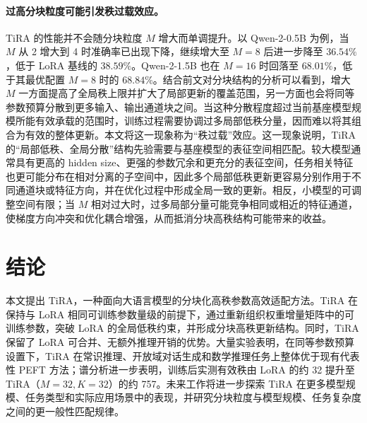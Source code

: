 ﻿\documentclass[UTF8,a4paper,11pt]{ctexart}
\begin{document}
\paragraph{过高分块粒度可能引发秩过载效应。}
TiRA 的性能并不会随分块粒度 $M$ 增大而单调提升。以 Qwen-2-0.5B 为例，当 $M$ 从 2 增大到 4 时准确率已出现下降，继续增大至 $M=8$ 后进一步降至 $36.54\%$，低于 LoRA 基线的 $38.59\%$。Qwen-2-1.5B 也在 $M=16$ 时回落至 $68.01\%$，低于其最优配置 $M=8$ 时的 $68.84\%$。结合前文对分块结构的分析可以看到，增大 $M$ 一方面提高了全局秩上限并扩大了局部更新的覆盖范围，另一方面也会将同等参数预算分散到更多输入、输出通道块之间。当这种分散程度超过当前基座模型规模所能有效承载的范围时，训练过程需要协调过多局部低秩分量，因而难以将其组合为有效的整体更新。本文将这一现象称为“秩过载”效应。这一现象说明，TiRA 的“局部低秩、全局分散”结构先验需要与基座模型的表征空间相匹配。较大模型通常具有更高的 hidden size、更强的参数冗余和更充分的表征空间，任务相关特征也更可能分布在相对分离的子空间中，因此多个局部低秩更新更容易分别作用于不同通道块或特征方向，并在优化过程中形成全局一致的更新。相反，小模型的可调整空间有限；当 $M$ 相对过大时，过多局部分量可能竞争相同或相近的特征通道，使梯度方向冲突和优化耦合增强，从而抵消分块高秩结构可能带来的收益。

\section{结论}

本文提出 TiRA，一种面向大语言模型的分块化高秩参数高效适配方法。TiRA 在保持与 LoRA 相同可训练参数量级的前提下，通过重新组织权重增量矩阵中的可训练参数，突破 LoRA 的全局低秩约束，并形成分块高秩更新结构。同时，TiRA 保留了 LoRA 可合并、无额外推理开销的优势。大量实验表明，在同等参数预算设置下，TiRA 在常识推理、开放域对话生成和数学推理任务上整体优于现有代表性 PEFT 方法；谱分析进一步表明，训练后实测有效秩由 LoRA 的约 32 提升至 TiRA（$M=32,K=32$）的约 757。未来工作将进一步探索 TiRA 在更多模型规模、任务类型和实际应用场景中的表现，并研究分块粒度与模型规模、任务复杂度之间的更一般性匹配规律。
\end{document}
